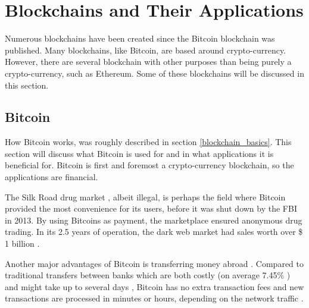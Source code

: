 

\section{Blockchains and Their Applications}
Numerous blockchains have been created since the Bitcoin blockchain was published. Many blockchains, like Bitcoin, are based around crypto-currency. However, there are several blockchain with other purposes than being purely a crypto-currency, such as Ethereum. Some of these blockchains will be discussed in this section.

\subsection{Bitcoin}
How Bitcoin works, was roughly described in section \ref{blockchain_basics}. This section will discuss what Bitcoin is used for and in what applications it is beneficial for. Bitcoin is first and foremost a crypto-currency blockchain, so the applications are financial.

The Silk Road drug market \cite{silk}, albeit illegal, is perhaps the field where Bitcoin provided the most convenience for its users, before it was shut down by the FBI in 2013. By using Bitcoins as payment, the marketplace ensured anonymous drug trading. In its 2.5 years of operation, the dark web market had sales worth over \$ 1 billion \cite{Ethereum_visions}.

Another major advantages of Bitcoin is transferring money abroad \cite{wirex}. Compared to traditional transfers between banks which are both costly (on average 7.45\% \cite{world_bank_group}) and might take up to several days , Bitcoin has no extra transaction fees and new transactions are processed in minutes or hours, depending on the network traffic \cite{transfer_time}. 

